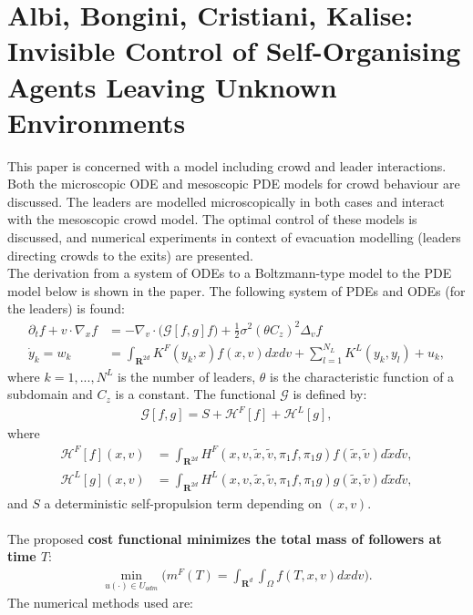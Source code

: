 \documentclass[11pt, a4paper]{article}
\theoremstyle{definition}
\begin{document}
\section{Albi, Bongini, Cristiani, Kalise: Invisible Control of Self-Organising Agents Leaving Unknown Environments \cite{albi2016no2}}
This paper is concerned with a model including crowd and leader interactions. Both the microscopic ODE and mesoscopic PDE models for crowd behaviour are discussed. The leaders are modelled microscopically in both cases and interact with the mesoscopic crowd model. The optimal control of these models is discussed, and numerical experiments in context of evacuation modelling (leaders directing crowds to the exits) are presented.\\
The derivation from a system of ODEs to a Boltzmann-type model to the PDE model below is shown in the paper. The following system of PDEs and ODEs (for the leaders) is found:
\begin{align*}
\partial_t f + v \cdot \nabla_x f &= - \nabla_v \cdot \bigg(\mathcal{G}[f,g]f\bigg) + \frac{1}{2}\sigma^2(\theta C_z)^2 \Delta_v f\\
\dot{y}_k = w_k &= \int_{\mathbf{R}^{2d}} K^F(y_k,x)f(x,v)dxdv + \sum_{l=1}^{N_L}K^L(y_k,y_l) +u_k,
\end{align*}
where $k=1,...,N^L$ is the number of leaders, $\theta$ is the characteristic function of a subdomain and $C_z$ is a constant. The functional $\mathcal{G}$ is defined by:
\begin{align*}
\mathcal{G}[f,g]= S + \mathcal{H}^F[f] + \mathcal{H}^L[g],
\end{align*}
where
\begin{align*}
\mathcal{H}^F[f](x,v) &= \int_{\mathbf{R}^{2d}}H^F(x,v,\tilde x,\tilde v,\pi_1f,\pi_1 g) f(\tilde x, \tilde v) d \tilde x d \tilde v,\\
\mathcal{H}^L[g](x,v) &= \int_{\mathbf{R}^{2d}}H^L(x,v,\tilde x,\tilde v,\pi_1f,\pi_1 g) g(\tilde x, \tilde v) d \tilde x d \tilde v,
\end{align*}
and $S$ a deterministic self-propulsion term depending on $(x,v)$.\\
\\
The proposed \textbf{cost functional minimizes the total mass of followers at time $T$}:
\begin{align*}
\min_{u(\cdot) \in U_{adm}} \bigg( m^F(T) = \int_{\mathbf{R}^{d}} \int_{\Omega} f(T,x,v)dx dv \bigg).
\end{align*}
The numerical methods used are:\\
\end{document}
